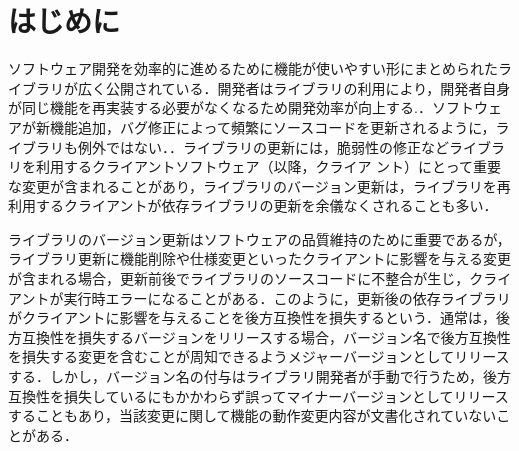 \documentclass[T,J]{fose} %
\begin{document}
%
%
\maketitle \thispagestyle {empty}

\section{はじめに}

ソフトウェア開発を効率的に進めるために機能が使いやすい形にまとめられたライブラリが広く公開されている．開発者はライブラリの利用により，開発者自身が同じ機能を再実装する必要がなくなるため開発効率が向上する.\cite{konstantopoulos2009best}\cite{Moser1996effect}．ソフトウェアが新機能追加，バグ修正によって頻繁にソースコードを更新されるように，ライブラリも例外ではない．\cite{raemaekers2012measuring}．ライブラリの更新には，脆弱性の修正などライブラリを利用するクライアントソフトウェア（以降，クライア
ント）にとって重要な変更が含まれることがあり，ライブラリのバージョン更新は，ライブラリを再利用するクライアントが依存ライブラリの更新を余儀なくされることも多い．

ライブラリのバージョン更新はソフトウェアの品質維持のために重要であるが，ライブラリ更新に機能削除や仕様変更といったクライアントに影響を与える変更が含まれる場合，更新前後でライブラリのソースコードに不整合が生じ，クライアントが実行時エラーになることがある．このように，更新後の依存ライブラリがクライアントに影響を与えることを後方互換性を損失するという．通常は，後方互換性を損失するバージョンをリリースする場合，バージョン名で後方互換性を損失する変更を含むことが周知できるようメジャーバージョンとしてリリースする．しかし，バージョン名の付与はライブラリ開発者が手動で行うため，後方互換性を損失しているにもかかわらず誤ってマイナーバージョンとしてリリースすることもあり，当該変更に関して機能の動作変更内容が文書化されていないことがある\cite{mostafa2017experience}．
\end{document}
